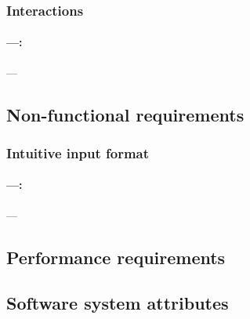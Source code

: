 \documentclass[12pt,a4paper]{article}
\begin{document}
\subsubsection{Interactions}
\paragraph{---:} ---

\subsection{Non-functional requirements}
\setcounter{subsubsection}{0}
\setcounter{paragraph}{0}
\subsubsection{Intuitive input format}
\paragraph{---:} ---


\subsection{Performance requirements}

\subsection{Software system attributes}
\end{document}
